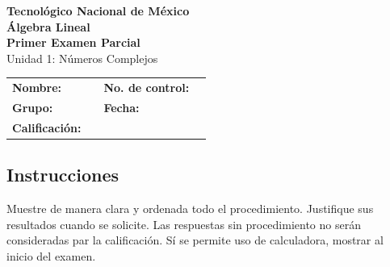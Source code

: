 \documentclass[12pt]{article}
\newcommand{\institucion}{Tecnológico Nacional de México}
\newcommand{\materia}{Álgebra Lineal}
\newcommand{\nombreexamen}{Primer Examen Parcial}
\newcommand{\unidad}{Unidad 1: Números Complejos}
\begin{document}

\begin{center}
    {\Large\textbf{\institucion}}\\[0.1em]
    {\large\textbf{\materia}}\\[0.1em]
    {\large\textbf{\nombreexamen}}\\[0.1em]
    {\normalsize\unidad}
\end{center}

\vspace{0.15em}


\begin{tabularx}{\textwidth}{>{\bfseries}l X >{\bfseries}l X}
Nombre: & \hrulefill &
No. de control: & \hrulefill \\[1.2em]

Grupo: & \hrulefill &
Fecha: & \hrulefill \\[1.2em]

Calificación: & \hrulefill &

\end{tabularx}





\subsection*{Instrucciones}
Muestre de manera clara y ordenada todo el procedimiento. Justifique sus resultados cuando se solicite. Las respuestas sin procedimiento no serán consideradas par la calificaci\'on. Sí se permite uso de calculadora, mostrar al inicio del examen.

\end{document}
